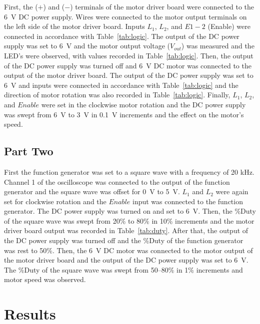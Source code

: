 First, the ($+$) and ($-$) terminals of the motor driver board were connected to the \SI{6}{V} DC power supply.  Wires were connected to the motor output terminals on the left side of the motor driver board.  Inputs $L_1$, $L_2$, and $E1-2$ (Enable) were connected in accordance with Table~\ref{tab:logic}.  The output of the DC power supply was set to \SI{6}{V} and the motor output voltage ($V_{out}$) was measured and the LED's were observed, with values recorded in Table~\ref{tab:logic}.  Then, the output of the DC power supply was turned off and \SI{6}{V} DC motor was connected to the output of the motor driver board.  The output of the DC power supply was set to \SI{6}{V} and inputs were connected in accordance with Table~\ref{tab:logic} and the direction of motor rotation was also recorded in Table~\ref{tab:logic}.  Finally, $L_1$, $L_2$, and $Enable$ were set in the clockwise motor rotation and the DC power supply was swept from \SI{6}{V} to \SI{3}{V} in \SI{0.1}{V} increments and the effect on the motor's speed.

\subsection{Part Two}
\label{sec:part_two}

First the function generator was set to a square wave with a frequency of 20 kHz.  Channel 1 of the oscilloscope was connected to the output of the function generator and the square wave was offset for \SI{0}{V} to \SI{5}{V}.  $L_1$ and $L_2$ were again set for clockwise rotation and the $Enable$ input was connected to the function generator.  The DC power supply was turned on and set to \SI{6}{V}.  Then, the \%Duty of the square wave was swept from 20\% to 80\% in 10\% increments and the motor driver board output was recorded in Table~\ref{tab:duty}.  After that, the output of the DC power supply was turned off and the \%Duty of the function generator was rest to 50\%.  Then, the \SI{6}{V} DC motor was connected to the motor output of the motor driver board and the output of the DC power supply was set to \SI{6}{V}.  The \%Duty of the square wave was swept from 50--80\% in 1\% increments and motor speed was observed.

\section{Results}
\label{sec:results}

